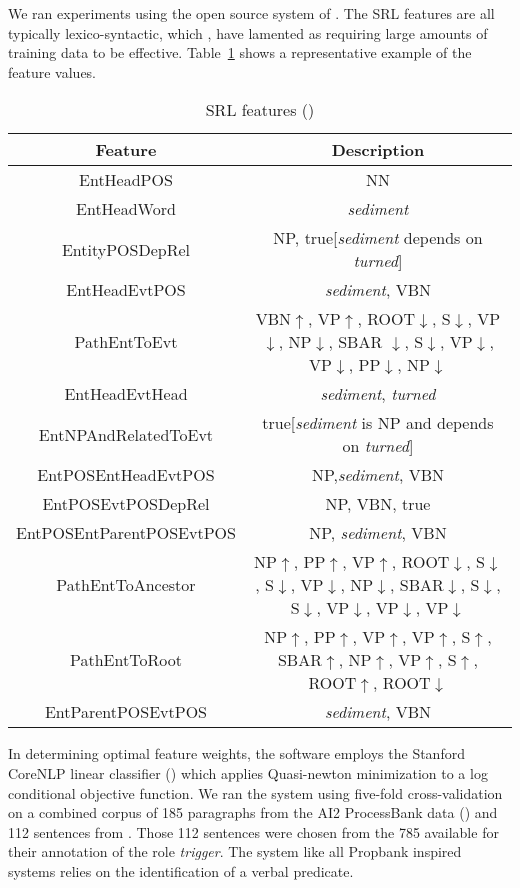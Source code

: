 \documentclass{article} %
\def\func#1{\textrm{\bf{\sc{#1}}}}
\begin{document}
We ran experiments using the open source \func{bioprocess} system of \cite{sca}.  The SRL features are all typically lexico-syntactic, which \cite{bala}, \cite{gil} have lamented as requiring large amounts of training data to be effective.  Table~\ref{features} shows a representative example of the feature values.
\begin{table}[t]
\centering
\renewcommand{\arraystretch}{1.4}
\begin{tabular}{c c} \toprule
  Feature & Description\\ \midrule
  EntHeadPOS  &  NN\\
  EntHeadWord   &  {\it sediment}\\
  EntityPOSDepRel &  NP, true[{\it sediment} depends on {\it turned}] \\
  EntHeadEvtPOS   & {\it sediment}, VBN \\
  PathEntToEvt  &  VBN$\uparrow$, VP$\uparrow$, ROOT$\downarrow$, S$\downarrow$, VP$\downarrow$, NP$\downarrow$, SBAR $\downarrow$, S$\downarrow$, VP$\downarrow$, VP$\downarrow$, PP$\downarrow$, NP$\downarrow$\\
  EntHeadEvtHead &    {\it sediment}, {\it turned} \\
  EntNPAndRelatedToEvt   & true[{\it sediment} is NP and depends on {\it turned}]  \\
  EntPOSEntHeadEvtPOS  &   NP,{\it sediment}, VBN \\
  EntPOSEvtPOSDepRel  &   NP, VBN, true\\
  EntPOSEntParentPOSEvtPOS  &  NP, {\it sediment}, VBN \\
  PathEntToAncestor  &  NP$\uparrow$, PP$\uparrow$,  VP$\uparrow$, ROOT$\downarrow$, S$\downarrow$, S$\downarrow$, VP$\downarrow$, NP$\downarrow$, SBAR$\downarrow$, S$\downarrow$, S$\downarrow$, VP$\downarrow$, VP$\downarrow$, VP$\downarrow$  \\
  PathEntToRoot  &  NP$\uparrow$, PP$\uparrow$,  VP$\uparrow$, VP$\uparrow$,  S$\uparrow$, SBAR$\uparrow$, NP$\uparrow$, VP$\uparrow$, S$\uparrow$, ROOT$\uparrow$, ROOT$\downarrow$ \\
  EntParentPOSEvtPOS  &  {\it sediment}, VBN \\
\bottomrule
\end{tabular}
\caption{SRL features (\cite{sca})}\label{features}
\end{table}
In determining optimal feature weights, the \func{bioprocess} software employs the Stanford CoreNLP linear classifier (\cite{stanny}) which applies Quasi-newton minimization to a log conditional objective function.
We ran the system using five-fold cross-validation on a combined corpus of 185 paragraphs from the AI2 ProcessBank data (\cite{ai2}) and 112 sentences from \cite{sl}.  Those 112 sentences were chosen from the 785 available for their annotation of the role {\it trigger}.  The \func{bioprocess} system like all Propbank inspired systems relies on the identification of a verbal predicate.
\end{document}
